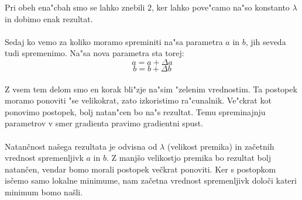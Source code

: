 Pri obeh ena"cbah smo se lahko znebili $2$, ker lahko pove"camo na"so konstanto $\lambda$ in dobimo enak rezultat.

\paragraph{}
Sedaj ko vemo za koliko moramo spreminiti na"sa parametra $a$ in $b$, jih seveda tudi spremenimo. Na"sa nova parametra sta torej:
\[a = a + \Delta a \]
\[b = b + \Delta b \]

\paragraph{}
Z vsem tem delom smo en korak bli"zje na"sim "zelenim vrednostim. Ta postopek moramo ponoviti "se velikokrat, zato izkoristimo ra"cunalnik. Ve"ckrat kot ponovimo postopek, bolj natan"cen bo na"s rezultat. Temu spreminajnju parametrov v smer gradienta pravimo gradientni spust.

\paragraph{}
Natančnost našega rezultata je odvisna od $\lambda$ (velikost premika) in začetnih vrednost spremenljivk $a$ in $b$. Z manjšo velikostjo premika bo rezultat bolj natančen, vendar bomo morali postopek večkrat ponoviti. Ker s postopkom isčemo samo lokalne minimume, nam začetna vrednost spremenljivk določi kateri minimum bomo našli.